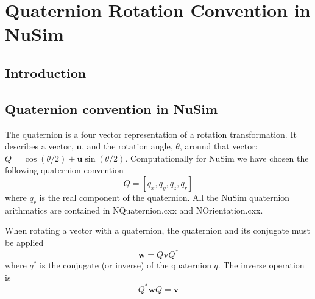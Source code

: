

%

\chapter{Quaternion Rotation Convention in NuSim}

\section*{Introduction}

\section{Quaternion convention in NuSim}
The quaternion is a four vector representation of a rotation transformation. It describes a vector, $\mathbf{u}$, and the rotation angle, $\theta$, around that vector:  $Q = \cos(\theta/2)+\mathbf{u}\sin(\theta/2)$. Computationally for NuSim we have chosen the following quaternion convention
\begin{equation}
Q = [q_x, q_y, q_z,q_r]  
\end{equation}
where $q_r$ is the real component of the quaternion. All the NuSim quaternion arithmatics are contained in NQuaternion.cxx and NOrientation.cxx.

When rotating a vector with a quaternion, the quaternion and its conjugate must be applied
\begin{equation}
\mathbf{w} = Q\mathbf{v}Q^*   
\end{equation}
where $q^*$ is the conjugate (or inverse) of the quaternion $q$. The inverse operation is
\begin{equation}
Q^*\mathbf{w}Q = \mathbf{v}   
\end{equation}

